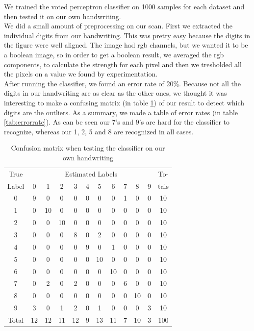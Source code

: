 \documentclass[%
        compressed,
        final,
        notitlepage,
        narroweqnarray,
        inline,
        twoside,
        ]{ieee}
\begin{document}
We trained the voted perceptron classifier on 1000 samples for each dataset and
then tested it on our own handwriting. \\

We did a small amount of preprocessing on our scan. First we extracted the
individual digits from our handwriting. This was pretty easy because the digits
in the figure were well aligned. The image had rgb channels, but we wanted it to
be a boolean image, so in order to get a boolean result, we averaged the rgb
components, to calculate the strength for each pixel and then we tresholded all the
pixels on a value we found by experimentation. \\

After running the classifier, we found an error rate of 20\%.
Because not all the digits in our handwriting are as clear as the other ones, we
thought it was interesting to make a confusing matrix (in table
\ref{tab:confmatrix}) of our result to detect which digits are the outliers.
As a summary, we made a table of error rates (in table \ref{tab:errorrate}).
As can be seen our 7's and 9's are hard for the classifier to recognize, whereas
our 1, 2, 5 and 8 are recognized in all cases.

\begin{table}[H]
    \centering
    \begin{tabular}{|c|cccccccccc | c|}
        \hline 
        True   & \multicolumn{10}{c|}{Estimated Labels} & To-\\
        Label & 0 & 1 & 2 & 3 & 4 & 5 & 6 & 7 & 8 & 9 & tals \\
        \hline
        0 & 9 & 0  & 0  & 0 & 0 & 0  & 0  & 1 & 0  & 0 & 10 \\
        1 & 0 & 10 & 0  & 0 & 0 & 0  & 0  & 0 & 0  & 0 & 10 \\
        2 & 0 & 0  & 10 & 0 & 0 & 0  & 0  & 0 & 0  & 0 & 10 \\
        3 & 0 & 0  & 0  & 8 & 0 & 2  & 0  & 0 & 0  & 0 & 10 \\
        4 & 0 & 0  & 0  & 0 & 9 & 0  & 1  & 0 & 0  & 0 & 10 \\
        5 & 0 & 0  & 0  & 0 & 0 & 10 & 0  & 0 & 0  & 0 & 10 \\
        6 & 0 & 0  & 0  & 0 & 0 & 0  & 10 & 0 & 0  & 0 & 10 \\
        7 & 0 & 2  & 0  & 2 & 0 & 0  & 0  & 6 & 0  & 0 & 10 \\
        8 & 0 & 0  & 0  & 0 & 0 & 0  & 0  & 0 & 10 & 0 & 10 \\
        9 & 3 & 0  & 1  & 2 & 0 & 1  & 0  & 0 & 0  & 3 & 10 \\
        \hline 
        Total & 12 & 12 & 11 & 12 & 9 & 13 & 11 & 7 & 10 & 3 & 100 \\
        \hline 
    \end{tabular}
    \caption{Confusion matrix when testing the classifier on our own handwriting}
    \label{tab:confmatrix}
\end{table}
\end{document}
